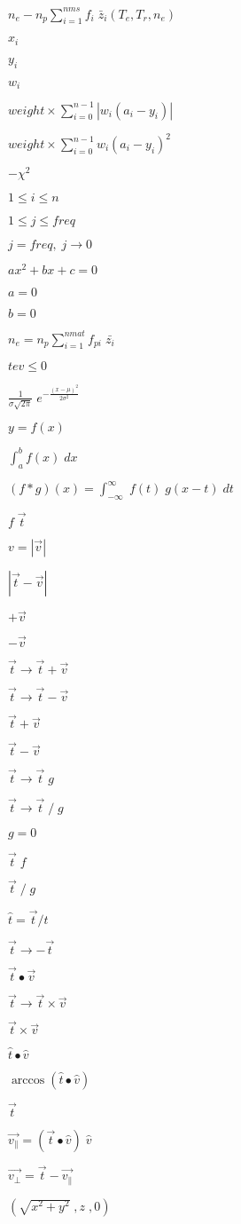 \documentclass{article}
\begin{document}
$n_e-n_p\sum_{i=1}^{nms}f_i\;\bar{z}_i(T_e,T_r,n_e)$
\pagebreak

$x_i$
\pagebreak

$y_i$
\pagebreak

$w_i$
\pagebreak

$weight \times \sum_{i=0}^{n-1} | w_i (a_i - y_i) |$
\pagebreak

$weight \times \sum_{i=0}^{n-1} w_i (a_i - y_i)^2$
\pagebreak

$-\chi^2$
\pagebreak

$1 \leq i \leq n$
\pagebreak

$1 \leq j \leq freq$
\pagebreak

$j=freq,\;j\rightarrow 0$
\pagebreak

$ax^2+bx+c=0$
\pagebreak

$a=0$
\pagebreak

$b=0$
\pagebreak

$n_e = n_p \sum_{i=1}^{nmat} f_{pi}\;\bar{z_i}$
\pagebreak

$ tev \leq 0 $
\pagebreak

$\frac{1}{\sigma\sqrt{2\pi}}\;e^{-\frac{(x-\mu)^2}{2\sigma^2}}$
\pagebreak

$y=f(x)$
\pagebreak

$\int_a^b f(x)\;dx$
\pagebreak

$(f*g)(x)=\int_{-\infty}^\infty\;f(t)\;g(x-t)\;dt$
\pagebreak

$f\;\vec{t}$
\pagebreak

$ v = |\vec{v}| $
\pagebreak

$ |\vec{t}-\vec{v}| $
\pagebreak

$+\vec{v}$
\pagebreak

$-\vec{v}$
\pagebreak

$\vec{t}\rightarrow\vec{t}+\vec{v}$
\pagebreak

$\vec{t}\rightarrow\vec{t}-\vec{v}$
\pagebreak

$\vec{t}+\vec{v}$
\pagebreak

$\vec{t}-\vec{v}$
\pagebreak

$\vec{t}\rightarrow\vec{t}\;g$
\pagebreak

$\vec{t}\rightarrow\vec{t}\;/\;g$
\pagebreak

$g=0$
\pagebreak

$\vec{t}\;f$
\pagebreak

$\vec{t}\;/\;g$
\pagebreak

$\hat{t}=\vec{t}/t$
\pagebreak

$\vec{t}\rightarrow -\vec{t}$
\pagebreak

$\vec{t}\bullet\vec{v}$
\pagebreak

$\vec{t}\rightarrow\vec{t}\times\vec{v}$
\pagebreak

$\vec{t}\times\vec{v}$
\pagebreak

$\hat{t}\bullet\hat{v}$
\pagebreak

$\arccos ( \hat{t}\bullet\hat{v} )$
\pagebreak

$\vec{t}$
\pagebreak

$\vec{v_{\parallel}}=(\vec{t}\bullet\hat{v})\;\hat{v}$
\pagebreak

$\vec{v_{\perp}}=\vec{t}-\vec{v_{\parallel}}$
\pagebreak

$(\sqrt{x^2+y^2}\;,z\;,0)$
\pagebreak
\end{document}
